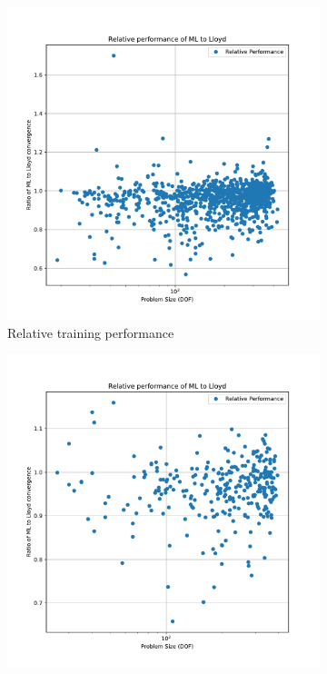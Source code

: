 \documentclass{article}
\begin{document}
\begin{figure}[h]
  \centering
  \begin{subfigure}[t]{0.49\textwidth}
    \centering
    \includegraphics[width=\textwidth]{aniso_rel_perf_train.pdf}
    \caption{Relative training performance}
  \end{subfigure}
  \begin{subfigure}[t]{0.49\textwidth}
    \centering
    \includegraphics[width=\textwidth]{aniso_rel_perf_test.pdf}

\end{subfigure}
\end{figure}
\end{document}
